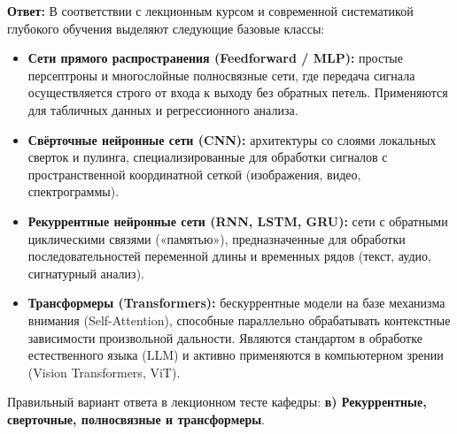 \textbf{Ответ:}
В соответствии с лекционным курсом и современной систематикой глубокого обучения выделяют следующие базовые классы:
\begin{itemize}
    \item \textbf{Сети прямого распространения (Feedforward / MLP):} простые персептроны и многослойные полносвязные сети, где передача сигнала осуществляется строго от входа к выходу без обратных петель. Применяются для табличных данных и регрессионного анализа.
    \item \textbf{Свёрточные нейронные сети (CNN):} архитектуры со слоями локальных сверток и пулинга, специализированные для обработки сигналов с пространственной координатной сеткой (изображения, видео, спектрограммы).
    \item \textbf{Рекуррентные нейронные сети (RNN, LSTM, GRU):} сети с обратными циклическими связями («памятью»), предназначенные для обработки последовательностей переменной длины и временных рядов (текст, аудио, сигнатурный анализ).
    \item \textbf{Трансформеры (Transformers):} бескуррентные модели на базе механизма внимания (Self-Attention), способные параллельно обрабатывать контекстные зависимости произвольной дальности. Являются стандартом в обработке естественного языка (LLM) и активно применяются в компьютерном зрении (Vision Transformers, ViT).
\end{itemize}
Правильный вариант ответа в лекционном тесте кафедры: \textbf{в) Рекуррентные, сверточные, полносвязные и трансформеры}.
